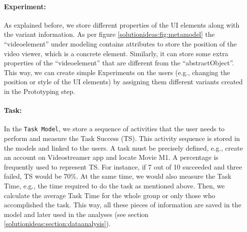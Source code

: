 \paragraph{Experiment:} As explained before, we store different properties of the UI elements along with the variant information. 
As per figure \ref{solutionideas:fig:metamodel} the ``videoelement'' under modeling contains attributes to store the position of the video viewer, which is a concrete element.
Similarly, it can store some extra properties of the ``videoelement'' that are different from the ``abstractObject''.
This way, we can create simple Experiments on the users (e.g., changing the position or style of the UI elements) by assigning them different variants created in the Prototyping step.


\paragraph{Task:} In the \texttt{Task Model}, we store a sequence of activities that the user needs to perform and measure the Task Success (TS).
This activity sequence is stored in the models and linked to the users.
A task must be precisely defined, e.g., create an account on Videostreamer app and locate Movie M1.
A percentage is frequently used to represent TS.
For instance, if 7 out of 10 succeeded and three failed, TS would be 70\%. 
At the same time, we would also measure the Task Time, e.g., the time required to do the task as mentioned above.
Then, we calculate the average Task Time for the whole group or only those who accomplished the task.
This way, all these pieces of information are saved in the model and later used in the analyses (see section \ref{solutionideas:section:dataanalysis}).

